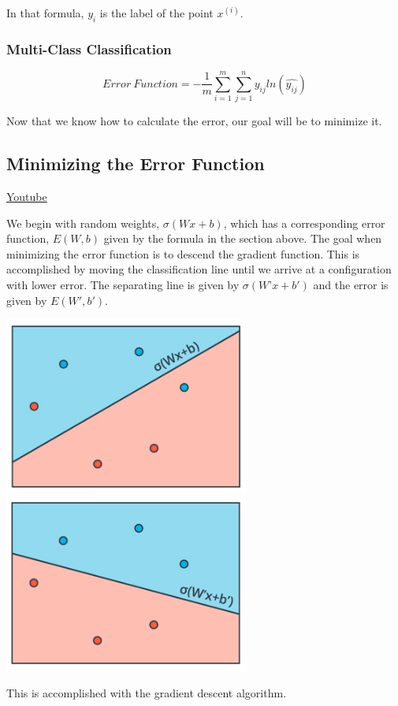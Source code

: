 In that formula, \(y_i\) is the label of the point  \(x^{(i)}\).

\subsubsection{Multi-Class Classification}
\[Error\ Function = -\frac{1}{m} \sum_{i=1}^m \sum_{j=1}^n y_{ij} ln(\hat{y_{ij}})\]

Now that we know how to calculate the error, our goal will be to minimize it.

\subsection{Minimizing the Error Function}
\href{https://www.youtube.com/watch?v=KayqiYijlzc&t=1s&ab_channel=Udacity}{Youtube} \newline

We begin with random weights, \(\sigma(Wx+b)\), which has a corresponding error function, \(E(W,b)\) given by the formula in the section above. The goal when minimizing the error function is to descend the gradient function. This is accomplished by moving the classification line until we arrive at a configuration with lower error. The separating line is given by \(\sigma(W’x+b')\) and the error is given by \(E(W',b')\).

\includegraphics[width=0.5\linewidth]{img//intro//neural-networks-18.png}
\includegraphics[width=0.5\linewidth]{img//intro//neural-networks-19.png}

This is accomplished with the gradient descent algorithm.


